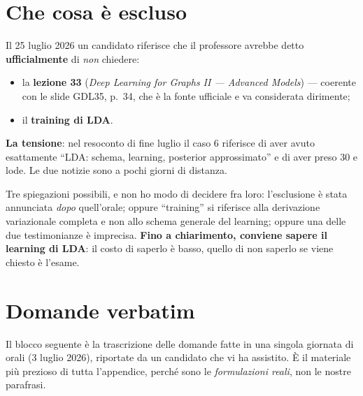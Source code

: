\section{Che cosa è escluso}

\begin{tcolorbox}[mywarn, title={Due esclusioni riportate, con una tensione irrisolta}]
Il 25 luglio 2026 un candidato riferisce che il professore avrebbe detto \textbf{ufficialmente} di \emph{non} chiedere:
\begin{itemize}[leftmargin=1.4em]
  \item la \textbf{lezione 33} (\emph{Deep Learning for Graphs II --- Advanced Models}) --- coerente con le slide GDL35, p.~34, che è la fonte ufficiale e va considerata dirimente;
  \item il \textbf{training di LDA}.
\end{itemize}

\textbf{La tensione}: nel resoconto di fine luglio il caso 6 riferisce di aver avuto esattamente ``LDA: schema, learning, posterior approssimato'' e di aver preso 30 e lode. Le due notizie sono a pochi giorni di distanza.

Tre spiegazioni possibili, e non ho modo di decidere fra loro: l'esclusione è stata annunciata \emph{dopo} quell'orale; oppure ``training'' si riferisce alla derivazione variazionale completa e non allo schema generale del learning; oppure una delle due testimonianze è imprecisa. \textbf{Fino a chiarimento, conviene sapere il learning di LDA}: il costo di saperlo è basso, quello di non saperlo se viene chiesto è l'esame.
\end{tcolorbox}

\section{Domande verbatim}

Il blocco seguente è la trascrizione delle domande fatte in una singola giornata di orali (3 luglio 2026), riportate da un candidato che vi ha assistito. È il materiale più prezioso di tutta l'appendice, perché sono le \emph{formulazioni reali}, non le nostre parafrasi.

